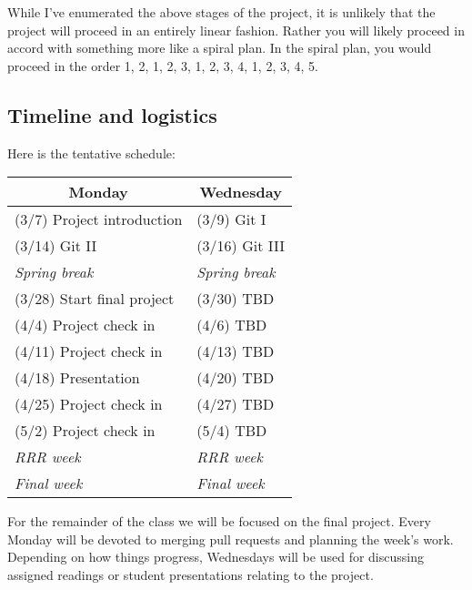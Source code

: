 \documentclass[11pt, oneside]{article}   	%
\begin{document}
While I've enumerated the above stages of the project, it is unlikely that the
project will proceed in an entirely linear fashion.  Rather you will likely
proceed in accord with something more like a spiral plan.  In the spiral plan,
you would proceed in the order 1, 2, 1, 2, 3, 1, 2, 3, 4, 1, 2, 3, 4, 5.

\subsection*{Timeline and logistics}

Here is the tentative schedule:

\begin{table}[h]
\centering
\begin{tabular}{@{}l|l@{}}
\toprule
\multicolumn{1}{c|}{Monday} & \multicolumn{1}{c}{Wednesday} \\
\hline
(3/7) Project introduction     & (3/9) Git I \\
(3/14) Git II                  & (3/16) Git III \\
\emph{\hspace{12mm} Spring break}  & \emph{\hspace{12mm} Spring break}\\
(3/28) Start final project     & (3/30) TBD\\
(4/4) Project check in         & (4/6) TBD\\
(4/11) Project check in        & (4/13) TBD\\
(4/18) Presentation            & (4/20) TBD\\
(4/25) Project check in        & (4/27) TBD\\
(5/2) Project check in         & (5/4) TBD\\
\emph{\hspace{12mm} RRR week}  & \emph{\hspace{12mm} RRR week}\\
\emph{\hspace{12mm} Final week}  & \emph{\hspace{12mm} Final week}\\
\bottomrule
\end{tabular}
\end{table}

For the remainder of the class we will be focused on the final project.  Every
Monday will be devoted to merging pull requests and planning the week's work.
Depending on how things progress, Wednesdays will be used for discussing
assigned readings or student presentations relating to the project.
\end{document}
